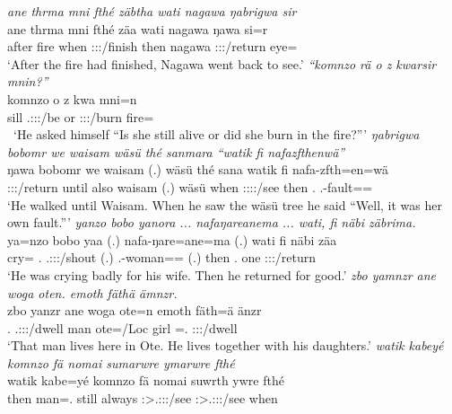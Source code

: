\begin{exe}
	\emph{ane thrma mni fthé zäbtha wati nagawa ŋabrigwa sir}\\
	\gll  ane thrma mni fthé zäa wati nagawa ŋawa si=r\\
	{\Dem} after fire when \Sg:\Sbj:\Pst:\Pfv/finish then nagawa \Sg:\Sbj:\Pst:\Ipfv/return eye=\Purp\\
	\trans `After the fire had finished, Nagawa went back to see.'
	\emph{``komnzo rä o z kwarsir mnin?''}\\
	\gll komnzo  o z kwa mni=n\\
	sill \Tsg.\F:\Sbj:\Nonpast:\Ipfv/be or {\Iam} \Sg:\Sbj:\Rpst:\Ipfv/burn fire=\Loc\\\
	\trans `He asked himself ``Is she still alive or did she burn in the fire?'''
\exi{100}
	\emph{ŋabrigwa bobomr we waisam wäsü thé sanmara ``watik fi nafazfthenwä''}\\
	\gll ŋa\stem{brig}wa bobomr we waisam (.) wäsü thé san\stem{mar}a watik fi nafa-zfth=en=wä\\
	\Sg:\Sbj:\Pst:\Ipfv/return until also waisam (.) wäsü when \Sg:\Sbj:\Pst:\Pfv:\Venit/see then \Third.{\Abs} \Third.\Poss-fault=\Loc={\Emph}\\
	\trans `He walked until Waisam. When he saw the wäsü tree he said ``Well, it was her own fault.'''
\exi{101}
	\emph{yanzo bobo yanora ... nafaŋareanema ... wati, fi näbi zäbrima.}\\
	\gll ya=nzo bobo ya\stem{nor}a (.) nafa-ŋare=ane=ma (.) wati fi näbi zäa\\
	cry={\Only} \Med.{\All} \Tsg.\Masc:\Sbj:\Pst:\Ipfv/shout (.) \Third.\Poss-woman=\Poss={\Char} (.) then \Third.{\Abs} one \Sg:\Sbj:\Pst:\Pfv/return\\
	\trans `He was crying badly for his wife. Then he returned for good.'
\exi{102}
	\emph{zbo yamnzr ane woga oten. emoth fäthä ämnzr.}\\
	\gll zbo yanzr ane woga ote=n emoth fäth=ä änzr\\
	\Prox.{\All} \Tsg.\Masc:\Sbj:\Nonpast:\Ipfv/dwell {\Dem} man ote=/Loc{} girl \Dim=\Assoc.{\Pl} \Stpl:\Sbj:\Nonpast:\Ipfv/dwell\\
	\trans `That man lives here in Ote. He lives together with his daughters.'
\exi{103}
	\emph{watik kabeyé komnzo fä nomai sumarwre ymarwre fthé}\\
	\gll watik kabe=yé komnzo fä nomai suwrth ywre fthé\\
	then man=\Erg.{\Nsg} still {\Dist} always \Stpl:\Sbj>\Tsg.\Masc:\Obj:\Rpst:\Ipfv/see \Fnsg:\Sbj>\Tsg.\Masc:\Obj:\Rpst:\Ipfv/see when\\

\end{exe}
